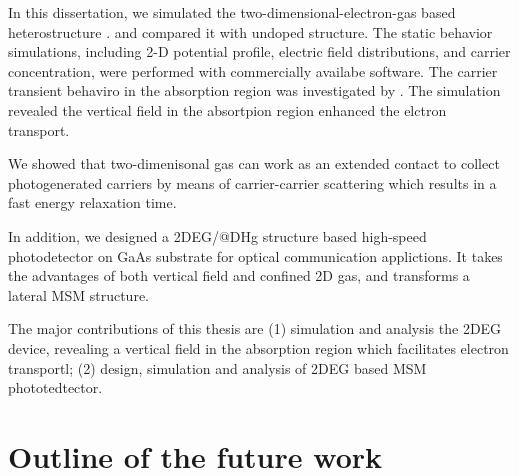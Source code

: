 In this dissertation, we simulated the two-dimensional-electron-gas based
heterostructure . and compared it with undoped structure. The static behavior
simulations, including 2-D potential profile, electric field distributions, and
carrier concentration, were performed with commercially availabe software. The
carrier transient behaviro in the absorption region was investigated by . The
simulation revealed the vertical field in the absortpion region enhanced the
elctron transport. 

We showed that two-dimenisonal gas can work as an extended contact to collect
photogenerated carriers by means of carrier-carrier scattering which results in
a fast energy relaxation time.

In addition, we designed a 2DEG/@DHg structure based high-speed photodetector
on GaAs substrate for optical communication applictions. It takes the
advantages of both vertical field and confined 2D gas, and transforms a lateral
MSM structure. 

The major contributions of this thesis are (1) simulation and analysis the 2DEG
device, revealing a vertical field in the absorption region which facilitates
electron transportl; (2) design, simulation and analysis of 2DEG based MSM
phototedtector.

\section{Outline of the future work}


